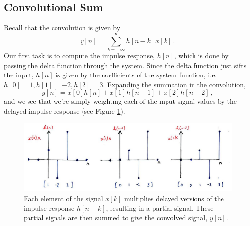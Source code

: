 \subsection{Convolutional Sum}
%
Recall that the convolution is given by
%
\begin{displaymath}
  y[n] = \sum_{k=-\infty}^\infty h[n-k] x[k] \,.
\end{displaymath}
%
Our first task is to compute the impulse response, $h[n]$, which is done by passing
the delta function through the system. Since the delta function just sifts the input,
$h[n]$ is given by the coefficients of the system function, i.e.
$h[0] = 1, h[1] = -2, h[2] = 3$. Expanding the summation in the convolution,
%
\begin{displaymath}
  y[n] = x[0]h[n] + x[1]h[n-1] + x[2]h[n-2] \,,
\end{displaymath}
%
and we see that we're simply weighting each of the input signal values by the
delayed impulse response (see Figure \ref{fig::lecture_3_impulse_response_weighting}).
%
\begin{figure}[!htb]
  \includegraphics[width=\textwidth]{images/lecture_3_impulse_response_weighting.JPG}
  \caption{
    Each element of the signal $x[k]$ multiplies delayed versions of the impulse
    response $h[n-k]$, resulting in a partial signal. These partial signals are
    then summed to give the convolved signal, $y[n]$.
  }
  \label{fig::lecture_3_impulse_response_weighting}
\end{figure}

